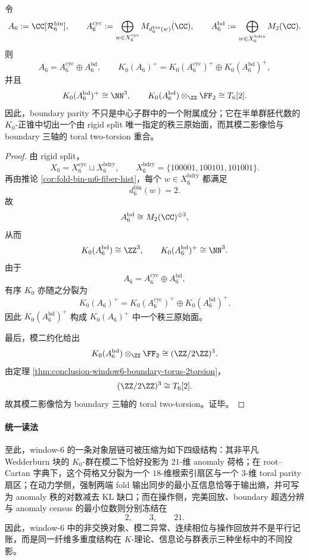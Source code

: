 \begin{proposition}\label{prop:conclusion-window6-boundary-k0-positive-cone-face}
令
\[
A_6:=\CC[\mathcal R_6^{\mathrm{bin}}],
\qquad
A_6^{\mathrm{cyc}}
:=
\bigoplus_{w\in X_6^{\mathrm{cyc}}}M_{d_6^{\mathrm{bin}}(w)}(\CC),
\qquad
A_6^{\mathrm{bd}}
:=
\bigoplus_{w\in X_6^{\mathrm{bdry}}}M_2(\CC).
\]
则
\[
A_6=A_6^{\mathrm{cyc}}\oplus A_6^{\mathrm{bd}},
\qquad
K_0(A_6)^+=K_0(A_6^{\mathrm{cyc}})^+\oplus K_0(A_6^{\mathrm{bd}})^+,
\]
并且
\[
K_0(A_6^{\mathrm{bd}})^+\cong \NN^3,
\qquad
K_0(A_6^{\mathrm{bd}})\otimes_{\ZZ}\FF_2
\cong
T_6[2].
\]
因此，boundary parity 不只是中心子群中的一个附属成分；它在半单群胚代数的 \(K_0\)-正锥中切出一个由 rigid split 唯一指定的秩三原始面，而其模二影像恰与 boundary 三轴的 toral two-torsion 重合。
\end{proposition}
\begin{proof}
由 rigid split，
\[
X_6=X_6^{\mathrm{cyc}}\sqcup X_6^{\mathrm{bdry}},
\qquad
X_6^{\mathrm{bdry}}=\{100001,100101,101001\}.
\]
再由推论 \ref{cor:fold-bin-m6-fiber-hist}，每个 \(w\in X_6^{\mathrm{bdry}}\) 都满足
\[
d_6^{\mathrm{bin}}(w)=2.
\]
故
\[
A_6^{\mathrm{bd}}\cong M_2(\CC)^{\oplus 3},
\]
从而
\[
K_0(A_6^{\mathrm{bd}})\cong \ZZ^3,
\qquad
K_0(A_6^{\mathrm{bd}})^+\cong \NN^3.
\]
由于
\[
A_6=A_6^{\mathrm{cyc}}\oplus A_6^{\mathrm{bd}},
\]
有序 \(K_0\) 亦随之分裂为
\[
K_0(A_6)^+=K_0(A_6^{\mathrm{cyc}})^+\oplus K_0(A_6^{\mathrm{bd}})^+.
\]
因此 \(K_0(A_6^{\mathrm{bd}})^+\) 构成 \(K_0(A_6)^+\) 中一个秩三原始面。

最后，模二约化给出
\[
K_0(A_6^{\mathrm{bd}})\otimes_{\ZZ}\FF_2\cong (\ZZ/2\ZZ)^3.
\]
由定理 \ref{thm:conclusion-window6-boundary-torus-2torsion}，
\[
(\ZZ/2\ZZ)^3\cong T_6[2].
\]
故其模二影像恰为 boundary 三轴的 toral two-torsion。证毕。
\end{proof}

\paragraph{统一读法}
至此，window-\(6\) 的一条对象层链可被压缩为如下四级结构：其非平凡 Wedderburn 块的 \(K_0\)-群在模二下恰好投影为 \(21\)-维 anomaly 荷格；在 root--Cartan 字典下，这个荷格又分裂为一个 \(18\)-维根索引扇区与一个 \(3\)-维 toral parity 扇区；在动力学侧，强制两端 fold 输出同步的最小互信息恰等于输出熵，并可写为 anomaly 秩的对数减去 KL 缺口；而在操作侧，完美回放、boundary 超选分辨与 anomaly census 的最小位数则分别冻结在
\[
2,\qquad 3,\qquad 21.
\]
因此，window-\(6\) 中的非交换对象、模二异常、连续相位与操作回放并不是平行记账，而是同一纤维多重度结构在 \(K\)-理论、信息论与群表示三种坐标中的不同投影。

\endinput
